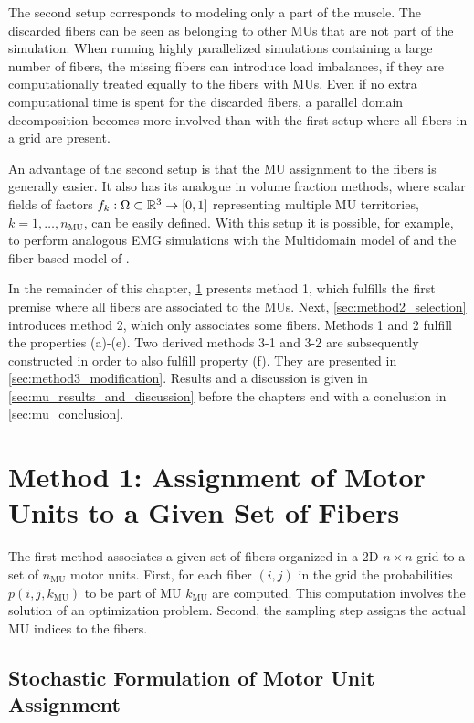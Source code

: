 The second setup corresponds to modeling only a part of the muscle. The discarded fibers can be seen as belonging to other MUs that are not part of the simulation. When running highly parallelized simulations containing a large number of fibers, the missing fibers can introduce load imbalances, if they are computationally treated equally to the fibers with MUs. Even if no extra computational time is spent for the discarded fibers, a parallel domain decomposition becomes more involved than with the first setup where all fibers in a grid are present.

An advantage of the second setup is that the MU assignment to the fibers is generally easier. It also has its analogue in volume fraction methods, where scalar fields of factors $f_k: \Omega \subset \mathbb{R}^3 \to [0,1]$ representing multiple MU territories, $k=1, \dots, n_\text{MU}$, can be easily defined. With this setup it is possible, for example, to perform analogous EMG simulations with the Multidomain model of \cite{Klotz2020} and the fiber based model of \cite{Mordhorst2015}.

In the remainder of this chapter, \cref{sec:method1_assignment} presents method 1, which fulfills the first premise where all fibers are associated to the MUs. Next, \cref{sec:method2_selection} introduces method 2, which only associates some fibers. Methods 1 and 2 fulfill the properties (a)-(e). Two derived methods 3-1 and 3-2 are subsequently constructed in order to also fulfill property (f). They are presented in \cref{sec:method3_modification}. Results and a discussion is given in \cref{sec:mu_results_and_discussion} before the chapters end with a conclusion in \cref{sec:mu_conclusion}.

\section{Method 1: Assignment of Motor Units to a Given Set of Fibers}\label{sec:method1_assignment}

The first method associates a given set of fibers organized in a 2D $n \times n$ grid to a set of $n_\text{MU}$ motor units.
First, for each fiber ${(i,j)}$ in the grid the probabilities $p(i,j,k_\text{MU})$ to be part of MU $k_\text{MU}$ are computed. This computation involves the solution of an optimization problem. Second, the sampling step assigns the actual MU indices to the fibers.

\subsection{Stochastic Formulation of Motor Unit Assignment}\label{sec:stochastic_formulation_and_algorithm}

